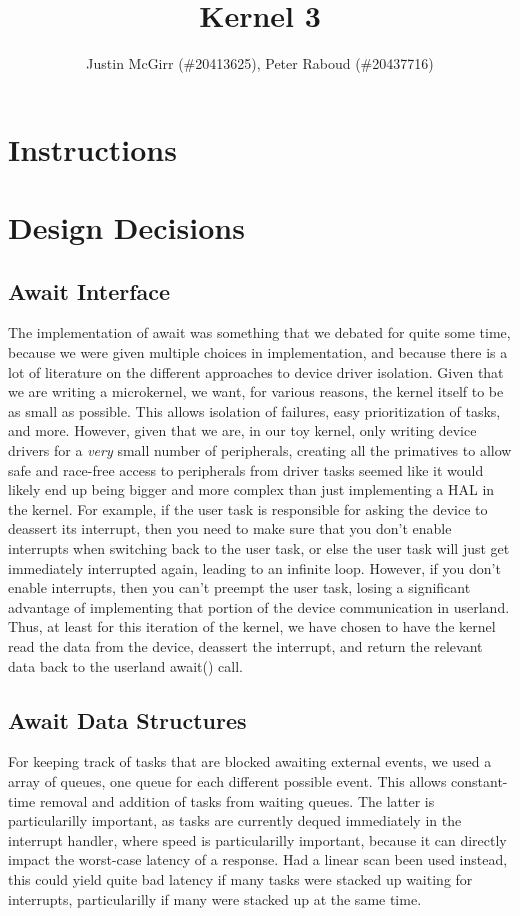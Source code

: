 \documentclass[titlepage]{article}
\begin{document}
\title{Kernel 3}
\author{Justin McGirr (\#20413625), Peter Raboud (\#20437716)}
\maketitle

\section{Instructions}


\section{Design Decisions}
\subsection{Await Interface}
The implementation of await was something that we debated for quite some time,
because we were given multiple choices in implementation, and because there is
a lot of literature on the different approaches to device driver isolation.
Given that we are writing a microkernel, we want, for various reasons, the
kernel itself to be as small as possible. This allows isolation of failures,
easy prioritization of tasks, and more. However, given that we are, in our toy
kernel, only writing device drivers for a \emph{very} small number of
peripherals, creating all the primatives to allow safe and race-free access
to peripherals from driver tasks seemed like it would likely end up being
bigger and more complex than just implementing a HAL in the kernel. For
example, if the user task is responsible for asking the device to deassert
its interrupt, then you need to make sure that you don't enable interrupts
when switching back to the user task, or else the user task will just get
immediately interrupted again, leading to an infinite loop. However, if you
don't enable interrupts, then you can't preempt the user task, losing a
significant advantage of implementing that portion of the device communication
in userland. Thus, at least for this iteration of the kernel, we have chosen
to have the kernel read the data from the device, deassert the interrupt,
and return the relevant data back to the userland await() call.

\subsection{Await Data Structures}
For keeping track of tasks that are blocked awaiting external events, we used
a array of queues, one queue for each different possible event. This allows
constant-time removal and addition of tasks from waiting queues. The latter
is particularilly important, as tasks are currently dequed immediately in the
interrupt handler, where speed is particularilly important, because it can
directly impact the worst-case latency of a response. Had a linear scan been
used instead, this could  yield quite bad latency if many tasks were stacked
up waiting for interrupts, particularilly if many were stacked up at the same
time.
\end{document}
